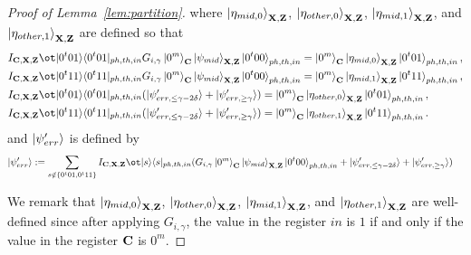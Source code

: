 \begin{proof}[Proof of Lemma~\ref{lem:partition}]
where $\ket{\eta_{mid,0}}_{\mathbf{X},\mathbf{Z}}$, $\ket{\eta_{other,0}}_{\mathbf{X},\mathbf{Z}}$, $\ket{\eta_{mid,1}}_{\mathbf{X},\mathbf{Z}}$, and $\ket{\eta_{other,1}}_{\mathbf{X},\mathbf{Z}}$ are defined so that
\begin{align}
& I_{\regC,\regX,\regZ} \ot \opro{0^t01}{0^t01}_{ph,th,in}G_{i,\gamma}\ket{0^m}_{\regC}\ket{\psi_{mid}}_{\regX,\regZ}\ket{0^t00}_{ph,th,in}=\ket{0^m}_{\regC}{\ket{\eta_{mid,0}}_{\regX,\regZ}}\ket{0^t01}_{ph,th,in}, \label{eq:etamid} \\
&I_{\regC,\regX,\regZ} \ot \opro{0^t11}{0^t11}_{ph,th,in}G_{i,\gamma}\ket{0^m}_{\regC}\ket{\psi_{mid}}_{\regX,\regZ}\ket{0^t00}_{ph,th,in}=\ket{0^m}_{\regC}{\ket{\eta_{mid,1}}_{\regX,\regZ}}\ket{0^t11}_{ph,th,in}, \label{eq:etamidprime} \\
&I_{\regC,\regX,\regZ} \ot \opro{0^t01}{0^t01}_{ph,th,in}(\ket{\psi'_{err,\leq \gamma-2\delta}}+\ket{\psi'_{err,\geq \gamma}})=\ket{0^m}_{\regC}{\ket{\eta_{other,0}}_{\regX,\regZ}}\ket{0^t01}_{ph,th,in}, \label{eq:etaother} \\
&I_{\regC,\regX,\regZ} \ot \opro{0^t11}{0^t11}_{ph,th,in}(\ket{\psi'_{err,\leq \gamma-2\delta}}+\ket{\psi'_{err,\geq \gamma}})=\ket{0^m}_{\regC}{\ket{\eta_{other,1}}_{\regX,\regZ}}\ket{0^t11}_{ph,th,in}. \label{eq:etaotherprime} 
\end{align}
and $\ket{\psi'_{err}}$  is defined by 
\begin{align}
\ket{\psi'_{err}}&:=
\sum_{s\notin \{0^t01,0^t11\}} I_{\regC,\regX,\regZ} \ot \opro{s}{s}_{ph,th,in}(G_{i,\gamma}\ket{0^m}_{\regC}\ket{\psi_{mid}}_{\regX,\regZ}\ket{0^t00}_{ph,th,in}+\ket{\psi'_{err,\leq \gamma-2\delta}}+\ket{\psi'_{err,\geq \gamma}}) \label{eq:psierrprime}
\end{align}

We remark that $\ket{\eta_{mid,0}}_{\mathbf{X},\mathbf{Z}}$, $\ket{\eta_{other,0}}_{\mathbf{X},\mathbf{Z}}$, $\ket{\eta_{mid,1}}_{\mathbf{X},\mathbf{Z}}$, and $\ket{\eta_{other,1}}_{\mathbf{X},\mathbf{Z}}$ are well-defined since after applying $G_{i,\gamma}$, the value in the register $in$ is $1$ if and only if the value in the register $\mathbf{C}$ is $0^m$.


\end{proof}
